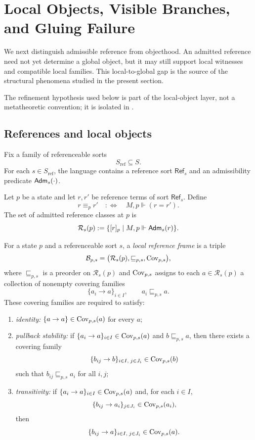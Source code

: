 ﻿\section{Local Objects, Visible Branches, and Gluing Failure}\label{sec:null-decomposition}

We next distinguish admissible reference from objecthood. An admitted reference need not yet determine a global object, but it may still support local witnesses and compatible local families. This local-to-global gap is the source of the structural phenomena studied in the present section.

The refinement hypothesis used below is part of the local-object layer, not a
metatheoretic convention; it is isolated in
.

\subsection{References and local objects}

Fix a family of referenceable sorts
\[
S_{\mathrm{ref}}\subseteq S.
\]
For each $s\in S_{\mathrm{ref}}$, the language contains a reference sort $\mathsf{Ref}_s$ and an admissibility predicate $\mathsf{Adm}_s(\cdot)$.

\begin{definition}\label{def:reference-classes}
Let $p$ be a state and let $r,r'$ be reference terms of sort $\mathsf{Ref}_s$. Define
\[
r\equiv_p r'
\quad:\Longleftrightarrow\quad
M,p\Vdash (r=r').
\]
The set of admitted reference classes at $p$ is
\[
\mathcal{R}_s(p):=\{[r]_p\mid M,p\Vdash \mathsf{Adm}_s(r)\}.
\]
\end{definition}

\begin{definition}\label{def:local-reference-frame}
For a state $p$ and a referenceable sort $s$, a \emph{local reference frame} is a triple
\[
\mathcal{B}_{p,s}=\bigl(\mathcal{R}_s(p),\sqsubseteq_{p,s},\mathrm{Cov}_{p,s}\bigr),
\]
where $\sqsubseteq_{p,s}$ is a preorder on $\mathcal{R}_s(p)$ and $\mathrm{Cov}_{p,s}$ assigns to each $a\in\mathcal{R}_s(p)$ a collection of nonempty covering families
\[
\{a_i\to a\}_{i\in I},
\qquad
a_i\sqsubseteq_{p,s} a.
\]
These covering families are required to satisfy:
\begin{enumerate}[label=(\roman*),nosep]
\item \emph{identity:} $\{a\to a\}\in\mathrm{Cov}_{p,s}(a)$ for every $a$;
\item \emph{pullback stability:} if $\{a_i\to a\}_{i\in I}\in\mathrm{Cov}_{p,s}(a)$ and $b\sqsubseteq_{p,s} a$, then there exists a covering family
\[
\{b_{ij}\to b\}_{i\in I,\;j\in J_i}\in\mathrm{Cov}_{p,s}(b)
\]
such that $b_{ij}\sqsubseteq_{p,s} a_i$ for all $i,j$;
\item \emph{transitivity:} if $\{a_i\to a\}_{i\in I}\in\mathrm{Cov}_{p,s}(a)$ and, for each $i\in I$,
\[
\{b_{ij}\to a_i\}_{j\in J_i}\in\mathrm{Cov}_{p,s}(a_i),
\]
then
\[
\{b_{ij}\to a\}_{i\in I,\;j\in J_i}\in\mathrm{Cov}_{p,s}(a).
\]
\end{enumerate}
\end{definition}

